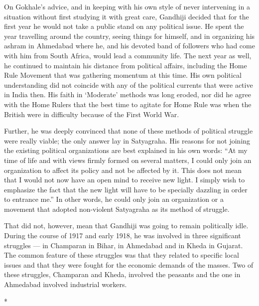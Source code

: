 \begin{multicols}{2}
On Gokhale's advice, and in keeping with his own style of never intervening in a situation without first studying it with great care, Gandhiji decided that for the first year he would not take a public stand on any political issue. He spent the year travelling around the country, seeing things for himself, and in organizing his ashram in Ahmedabad where he, and his devoted band of followers who had come with him from South Africa, would lead a community life. The next year as well, he continued to maintain his distance from political affairs, including the Home Rule Movement that was gathering momentum at this time. His own political understanding did not coincide with any of the political currents that were active in India then. His faith in `Moderate' methods was long eroded, nor did he agree with the Home Rulers that the best time to agitate for Home Rule was when the British were in difficulty because of the First World War.

Further, he was deeply convinced that none of these methods of political struggle were really viable; the only answer lay in Satyagraha. His reasons for not joining the existing political organizations are best explained in his own words: ``At my time of life and with views firmly formed on several matters, I could only join an organization to affect its policy and not be affected by it. This does not mean that I would not now have an open mind to receive new light. I simply wish to emphasize the fact that the new light will have to be specially dazzling in order to entrance me.'' In other words, he could only join an organization or a movement that adopted non-violent Satyagraha as its method of struggle.

That did not, however, mean that Gandhiji was going to remain politically idle. During the course of 1917 and early 1918, he was involved in three significant struggles --- in Champaran in Bihar, in Ahmedabad and in Kheda in Gujarat. The common feature of these struggles was that they related to specific local issues and that they were fought for the economic demands of the masses. Two of these struggles, Champaran and Kheda, involved the peasants and the one in Ahmedabad involved industrial workers.

\begin{center}*\end{center}

\paragraph*{}


\end{multicols}
